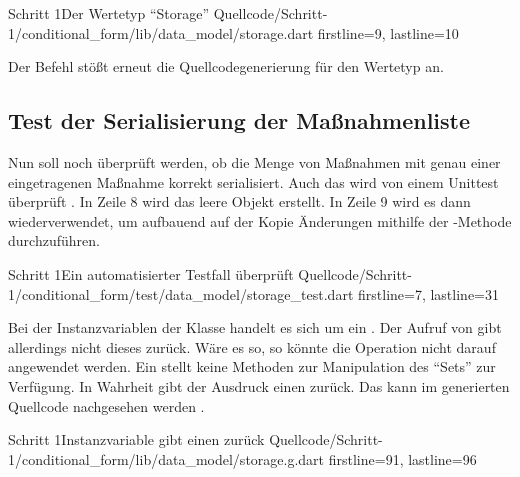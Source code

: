 \begin{alexlisting}{Schritt 1}{Der Wertetyp \enquote{Storage}}
  {Quellcode/Schritt-1/conditional_form/lib/data_model/storage.dart}
  {firstline=9, lastline=10}
  \label{lst:Schritt1WerteTypStorage}
\end{alexlisting}

Der Befehl   stößt erneut die Quellcodegenerierung für den Wertetyp  an.

\subsection{Test der Serialisierung der Maßnahmenliste}

Nun soll noch überprüft werden, ob die Menge von Maßnahmen mit genau einer eingetragenen Maßnahme korrekt serialisiert.
Auch das wird von einem Unittest überprüft \Lst{\ref{lst:Schritt1MassnahmenSerialisierenOhneFehlerUnitTest}}.
In Zeile 8 wird das leere Objekt  erstellt.
In Zeile 9 wird es dann wiederverwendet, um aufbauend auf der Kopie Änderungen mithilfe der -Methode durchzuführen.

\begin{alexlisting}{Schritt 1}{Ein automatisierter Testfall überprüft}
  {Quellcode/Schritt-1/conditional_form/test/data_model/storage_test.dart}
  {firstline=7, lastline=31}
  \label{lst:Schritt1MassnahmenSerialisierenOhneFehlerUnitTest}
\end{alexlisting}

Bei der Instanzvariablen  der Klasse  handelt es sich um ein .
 Der Aufruf von   gibt allerdings nicht dieses  zurück.
 Wäre es so, so könnte die Operation  nicht  darauf angewendet werden.
 Ein  stellt keine Methoden zur Manipulation des \enquote{Sets} zur Verfügung.
 In Wahrheit gibt der Ausdruck  einen  zurück.
 Das kann im generierten Quellcode nachgesehen werden \LstZ{\ref{lst:Schritt1InstanzvariableMassnahmenGibtEinenSetBuilderZurueck}}.

\begin{alexlisting}{Schritt 1}{Instanzvariable  gibt einen  zurück}
  {Quellcode/Schritt-1/conditional_form/lib/data_model/storage.g.dart}
  {firstline=91, lastline=96}
  \label{lst:Schritt1InstanzvariableMassnahmenGibtEinenSetBuilderZurueck}
\end{alexlisting}

